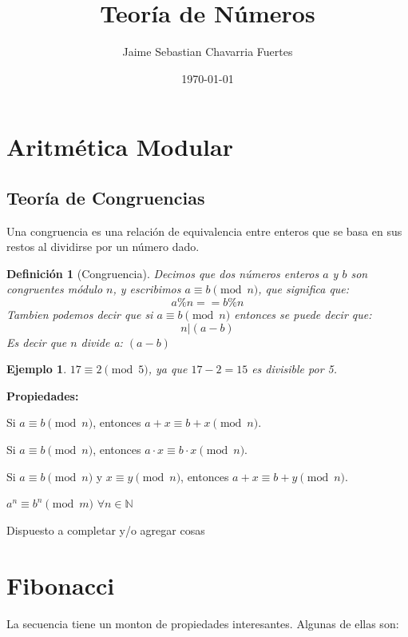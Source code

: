 \documentclass[12pt]{article}
\title{Teoría de Números}
\author{Jaime Sebastian Chavarria Fuertes}
\date{\today}
\newtheorem{definition}[theorem]{Definición}
\newtheorem{example}[theorem]{Ejemplo}
\begin{document}
\maketitle

\section{Aritmética Modular}

\subsection{Teoría de Congruencias}

Una congruencia es una relación de equivalencia entre enteros que se basa en sus restos al dividirse por un número dado.

\begin{definition}[Congruencia]
Decimos que dos números enteros \( a \) y \( b \) son congruentes módulo \( n \), y escribimos \( a \equiv b \pmod{n} \), que significa que: \[
a \% n == b \% n
\]
Tambien podemos decir que si \( a \equiv b \pmod{n} \) entonces se puede decir que:
\[ n | (a-b)\]
Es decir que \( n \) divide a: \( ( a - b ) \)
\end{definition}

\begin{example}
\( 17 \equiv 2 \pmod{5} \), ya que \( 17 - 2 = 15 \) es divisible por 5.
\end{example}
\textbf{Propiedades: }
\begin{propiedades}
    \item Si \( a \equiv b \pmod{n} \), entonces \( a + x \equiv b + x \pmod{n} \).
    \item Si \( a \equiv b \pmod{n} \), entonces \( a \cdot x \equiv b \cdot x \pmod{n} \).
    \item Si \( a \equiv b \pmod{n} \) y \( x \equiv y \pmod{n} \), entonces \( a + x \equiv b + y \pmod{n} \).
    \item \(a^{n} \equiv b^{n} \pmod{m}\)  \( \forall n \in \mathbb{N} \)
    \item Dispuesto a completar y/o agregar cosas
\end{propiedades}

\section{Fibonacci}
La secuencia tiene un monton de propiedades interesantes. Algunas de ellas son:
\end{document}
